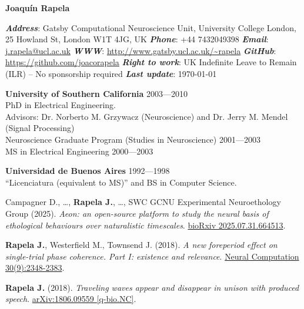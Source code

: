 \documentclass[10pt]{article}
\newcommand{\sectionleft}[1]{\noindent\makebox[0pt][r]{\makebox[1.1in][l]{\textbf{#1}}\hspace{0.2in}}}
\begin{document}
{\huge \textbf{Joaqu\'{i}n Rapela}}

\vspace{0.05in}
\textit{\textbf{Address}}: Gatsby Computational Neuroscience Unit, University College London, 25 Howland St, London W1T 4JG, UK
\textit{\textbf{Phone}}: +44 7432049398 \quad \textit{\textbf{Email}}: \href{mailto:j.rapela@ucl.ac.uk}{j.rapela@ucl.ac.uk} \quad \textit{\textbf{WWW}}: \url{http://www.gatsby.ucl.ac.uk/~rapela}
\textit{\textbf{GitHub}}: \url{https://github.com/joacorapela} \quad \textit{\textbf{Right to work}}: UK Indefinite Leave to Remain (ILR) -- No sponsorship required
\textit{\textbf{Last update}}: \today

\vspace{0.15in}

\sectionleft{Education}%
\textbf{University of Southern California} \hfill 2003---2010 \\
PhD in Electrical Engineering. \\
Advisors: Dr. Norberto M. Grzywacz (Neuroscience) and Dr. Jerry M. Mendel (Signal Processing) \\
Neuroscience Graduate Program (Studies in Neuroscience) \hfill 2001---2003 \\
MS in Electrical Engineering \hfill 2000---2003

\vspace{0.05in}
\sectionleft{}%
\textbf{Universidad de Buenos Aires} \hfill 1992---1998 \\
``Licenciatura (equivalent to MS)'' and BS in Computer Science.

\vspace{0.15in}

\sectionleft{Publications}%
Campagner D., \ldots, \textbf{Rapela J.}, \ldots, SWC GCNU Experimental
Neuroethology Group (2025). \textit{Aeon: an open-source platform to study the
neural basis of ethological behaviours over naturalistic timescales}.
\href{https://www.biorxiv.org/content/10.1101/2025.07.31.664513v1}{bioRxiv
2025.07.31.664513}.

\vspace{0.05in}
\textbf{Rapela J.}, Westerfield M., Townsend J. (2018). \textit{A new
foreperiod effect on single-trial phase coherence. Part I: existence and
relevance}.
\href{https://www.mitpressjournals.org/doi/abs/10.1162/neco_a_01109}{Neural
Computation 30(9):2348-2383}.

\vspace{0.05in}
\sectionleft{}%
\textbf{Rapela J.} (2018). \textit{Traveling waves appear and disappear in
unison with produced speech}. \href{https://arxiv.org/abs/1806.09559}{arXiv:1806.09559 [q-bio.NC]}.
\end{document}
